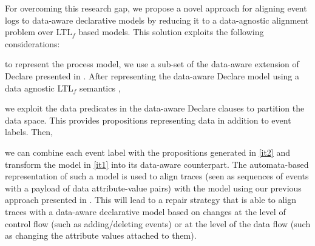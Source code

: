 
For overcoming this research gap, we propose a novel approach for aligning event logs to data-aware declarative models by reducing it to a data-agnostic alignment problem over LTL$_f$ based models. This solution exploits the following considerations: \begin{enumerate*}[label=\emph{\alph*})]
	\item \label{it1} to represent the process model, we use a sub-set of the data-aware extension of Declare presented in \cite{}. After representing the data-aware Declare model using a data agnostic LTL$_f$ semantics \cite{10.1007/978-3-642-40176-3_8},
	\item \label{it2} we exploit the data predicates in the data-aware Declare clauses to partition the data space. This provides propositions representing data in addition to event labels. Then,
	\item we can combine each event label with the propositions generated in \ref{it2} and transform the model in \ref{it1} into its data-aware counterpart. The automata-based representation of such a model is used to align traces (seen as sequences of events with a payload of data attribute-value pairs) with the model using our previous approach presented in \cite{XuLZ17a}. This will lead to a repair strategy that is able to align traces with a data-aware declarative model based on changes at the level of control flow (such as adding/deleting events) or at the level of the data flow (such as changing the attribute values attached to them).
\end{enumerate*}

